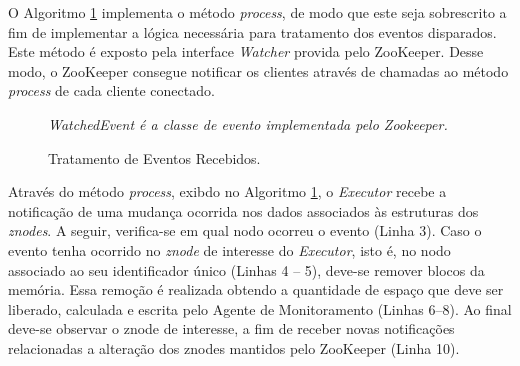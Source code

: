 O Algoritmo \ref{fig:data-monitor-spark} implementa o método \textit{process}, de modo que este  seja sobrescrito a fim de implementar a lógica necessária para tratamento dos eventos disparados. Este método é exposto pela interface \textit{Watcher} provida pelo ZooKeeper. Desse modo, o ZooKeeper consegue notificar os clientes através de chamadas ao método \textit{process} de cada cliente conectado.


\begin{figure}[!ht]
    \begin{algorithm}[H]
    \caption{Tratamento de Eventos Recebidos.}
        \label{fig:data-monitor-spark}
        
        \BlankLine
        \emph{WatchedEvent é a classe de evento implementada pelo Zookeeper.}\\
    \end{algorithm}
\end{figure}

Através do método \textit{process}, exibdo no Algoritmo \ref{fig:data-monitor-spark}, o \textit{Executor} recebe a notificação de uma mudança ocorrida nos dados associados às estruturas dos \textit{znodes}. A seguir, verifica-se em qual nodo ocorreu o evento (Linha 3). Caso o evento tenha ocorrido no \textit{znode} de interesse do \textit{Executor}, isto é, no nodo associado ao seu identificador único (Linhas 4 -- 5), deve-se remover blocos da memória. Essa remoção é realizada obtendo a quantidade de espaço que deve ser liberado, calculada e escrita pelo Agente de Monitoramento (Linhas 6--8). Ao final deve-se observar o znode de interesse, a fim de receber novas notificações relacionadas a alteração dos znodes mantidos pelo ZooKeeper (Linha 10).

